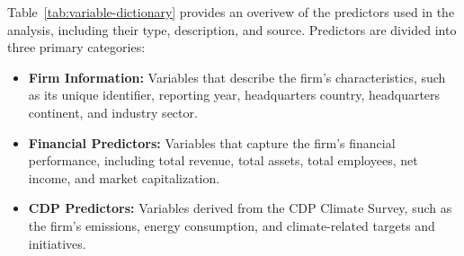 \noindent Table~\ref{tab:variable-dictionary} provides an overivew of the predictors used in the analysis, including their type, description, and source. Predictors are divided into three primary categories: \begin{itemize}
    \item \textbf{Firm Information:} Variables that describe the firm's characteristics, such as its unique identifier, reporting year, headquarters country, headquarters continent, and industry sector.
    \item \textbf{Financial Predictors:} Variables that capture the firm's financial performance, including total revenue, total assets, total employees, net income, and market capitalization.
    \item \textbf{CDP Predictors:} Variables derived from the CDP Climate Survey, such as the firm's emissions, energy consumption, and climate-related targets and initiatives.
\end{itemize}
